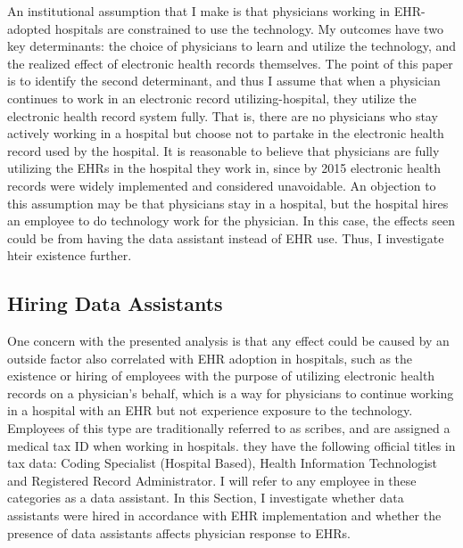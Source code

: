 \documentclass[11pt]{article}
\begin{document}
An institutional assumption that I make is that physicians working in EHR-adopted hospitals are constrained to use the technology. My outcomes have two key determinants: the choice of physicians to learn and utilize the technology, and the realized effect of electronic health records themselves. The point of this paper is to identify the second determinant, and thus I assume that when a physician continues to work in an electronic record utilizing-hospital, they utilize the electronic health record system fully. That is, there are no physicians who stay actively working in a hospital but choose not to partake in the electronic health record used by the hospital. It is reasonable to believe that physicians are fully utilizing the EHRs in the hospital they work in, since by 2015 electronic health records were widely implemented and considered unavoidable. An objection to this assumption may be that physicians stay in a hospital, but the hospital hires an employee to do technology work for the physician. In this case, the effects seen could be from having the data assistant instead of EHR use. Thus, I investigate hteir existence further.

\subsection{Hiring Data Assistants}\label{sec:dataass}

One concern with the presented analysis is that any effect could be caused by an outside factor also correlated with EHR adoption in hospitals, such as the existence or hiring of employees with the purpose of utilizing electronic health records on a physician's behalf, which is a way for physicians to continue working in a hospital with an EHR but not experience exposure to the technology. Employees of this type are traditionally referred to as scribes, and are assigned a medical tax ID when working in hospitals. they have the following official titles in tax data: Coding Specialist (Hospital Based), Health Information Technologist and Registered Record Administrator. I will refer to any employee in these categories as a data assistant. In this Section, I investigate whether data assistants were hired in accordance with EHR implementation and whether the presence of data assistants affects physician response to EHRs.  
\end{document}
